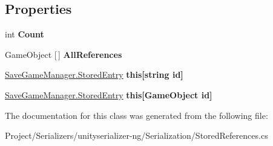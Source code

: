\subsection*{Properties}
\begin{DoxyCompactItemize}
\item 
\mbox{\label{class_stored_references_ab5db5e62d48b445e7c51d4c88e640aa9}} 
int {\bfseries Count}
\item 
\mbox{\label{class_stored_references_a6f87654d72a192e9d0d98c1633c67358}} 
Game\+Object \mbox{[}$\,$\mbox{]} {\bfseries All\+References}
\item 
\mbox{\label{class_stored_references_ab8dc5c6dbac10be877b2f347dbfbf2ec}} 
\hyperlink{class_save_game_manager_1_1_stored_entry}{Save\+Game\+Manager.\+Stored\+Entry} {\bfseries this\mbox{[}string id\mbox{]}}
\item 
\mbox{\label{class_stored_references_a01fd40bb59a909c460f5d08a5adae4c9}} 
\hyperlink{class_save_game_manager_1_1_stored_entry}{Save\+Game\+Manager.\+Stored\+Entry} {\bfseries this\mbox{[}\+Game\+Object id\mbox{]}}
\end{DoxyCompactItemize}


The documentation for this class was generated from the following file\+:\begin{DoxyCompactItemize}
\item 
Project/\+Serializers/unityserializer-\/ng/\+Serialization/Stored\+References.\+cs\end{DoxyCompactItemize}
